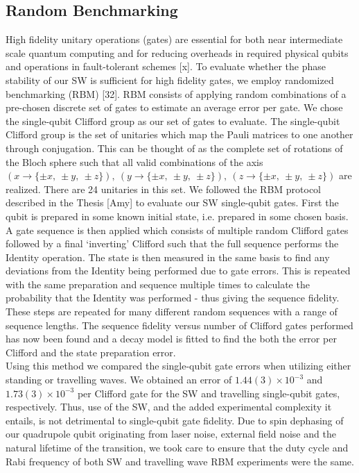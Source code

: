 \documentclass[12pt]{iopart}
\begin{document}
\subsection{Random Benchmarking}

    High fidelity unitary operations (gates) are essential for both
    near intermediate scale quantum computing and for reducing
    overheads in required physical qubits and operations in
    fault-tolerant schemes [x]. To evaluate whether the phase
    stability of our SW is sufficient for high fidelity gates, we
    employ randomized benchmarking (RBM) [32].  RBM consists of
    applying random combinations of a pre-chosen discrete set of gates
    to estimate an average error per gate.  We chose the single-qubit
    Clifford group as our set of gates to evaluate. The single-qubit
    Clifford group is the set of unitaries which map the Pauli
    matrices to one another through conjugation. This can be thought
    of as the complete set of rotations of the Bloch sphere such that
    all valid combinations of the axis
    $(x \rightarrow \{\pm x,~\pm y,~\pm z\}),~(y \rightarrow \{\pm x,~\pm y,~\pm z\}),~(z \rightarrow \{\pm x,~\pm y,~\pm z\})$
    are realized. There are 24 unitaries in this set. We followed the
    RBM protocol described in the Thesis [Amy] to evaluate our SW
    single-qubit gates. First the qubit is prepared in some known
    initial state, i.e. prepared in some chosen basis. A gate sequence
    is then applied which consists of multiple random Clifford gates
    followed by a final `inverting' Clifford such that the full
    sequence performs the Identity operation. The state is then
    measured in the same basis to find any deviations from the
    Identity being performed due to gate errors. This is repeated with
    the same preparation and sequence multiple times to calculate the
    probability that the Identity was performed - thus giving the
    sequence fidelity. These steps are repeated for many different
    random sequences with a range of sequence lengths. The sequence
    fidelity versus number of Clifford gates performed has now been
    found and a decay model is fitted to find the both the error per
    Clifford and the state preparation error.\\
    Using this method we compared the single-qubit gate errors when
    utilizing either standing or travelling waves. We obtained an
    error of $1.44(3) \times 10^{-3}$ and $1.73(3) \times 10^{-3}$ per
    Clifford gate for the SW and travelling single-qubit gates,
    respectively. Thus, use of the SW, and the added experimental
    complexity it entails, is not detrimental to single-qubit gate
    fidelity. Due to spin dephasing of our quadrupole qubit
    originating from laser noise, external field noise and the natural
    lifetime of the transition, we took care to ensure that the duty
    cycle and Rabi frequency of both SW and travelling wave RBM
    experiments were the same. \\
\end{document}
